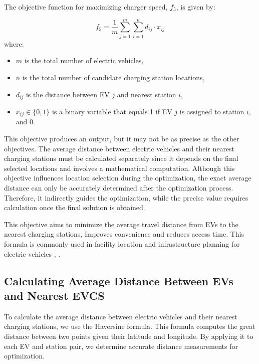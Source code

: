 \begin{enumerate}
    The objective function for maximizing charger speed, \( f_5 \), is given by:
    
    \[
    f_5 = \frac{1}{m} \sum_{j=1}^{m} \sum_{i=1}^{n} d_{ij} \cdot x_{ij}
    \]
    where:
    \begin{itemize}
        \item \( m \) is the total number of electric vehicles,
        \item \( n \) is the total number of candidate charging station locations,
        \item \( d_{ij} \) is the distance between EV \( j \) and nearest station \( i \),
        \item \( x_{ij} \in \{0, 1\} \) is a binary variable that equals 1 if EV \( j \) is assigned to station \( i \), and 0.
    \end{itemize}

    This objective produces an output, but it may not be as precise as the other objectives. The average distance between electric vehicles and their nearest charging stations must be calculated separately since it depends on the final selected locations and involves a mathematical computation. Although this objective influences location selection during the optimization, the exact average distance can only be accurately determined after the optimization process. Therefore, it indirectly guides the optimization, while the precise value requires calculation once the final solution is obtained. 
    

    This objective aims to minimize the average travel distance from EVs to the  nearest charging stations, Improves convenience and reduces access time. This formula is commonly used in facility location and infrastructure planning for electric vehicles \cite{A multi-objective optimization model for electric vehicle charging station location planning}, \cite{Multi-objective evolutionary algorithms for solving the electric vehicle charging station infrastructure problem}.    
\end{enumerate}

\subsection{Calculating Average Distance Between EVs and Nearest EVCS}

To calculate the average distance between electric vehicles and their nearest charging stations, we use the Haversine formula. This formula computes the great distance between two points given their latitude and longitude. By applying it to each EV and station pair, we determine accurate distance measurements for optimization.


